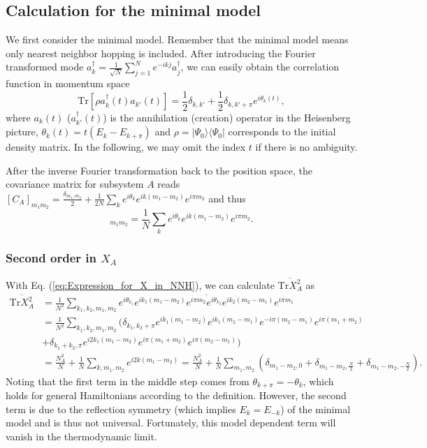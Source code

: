 \documentclass[aps,onecolumn,nofootinbib,superscriptaddress,notitlepage,longbibliography]{revtex4-1}
\def \Tr {\mathrm{Tr}}
\begin{document}
\subsection{Calculation for the minimal model}
We first consider the minimal model. %
Remember that the minimal model means only nearest neighbor hopping
is included. 
 After introducing the Fourier transformed 
 mode $a_{k}^{\dagger}=\frac{1}{\sqrt{N}}\sum_{j=1}^{N}e^{-ikj}a_{j}^{\dagger}$,
we can easily obtain the correlation function in momentum space
\begin{equation}
\Tr[\rho a_{k}^{\dagger}(t)a_{k'}(t)]=\frac{1}{2}\delta_{k,k'}+\frac{1}{2}\delta_{k,k'+\pi}e^{i\theta_{k}(t)},
\end{equation}
where $a_k(t)$ ($a^\dag_{k'}(t)$) is the annihilation (creation) operator in the Heisenberg picture, $\theta_{k}(t)=t(E_{k}-E_{k+\pi})$ and $\rho=|\Psi_0\rangle\langle\Psi_0|$ corresponds
to the initial density matrix. In the following, we may omit %
the
index $t$ if there is no ambiguity.

After the inverse Fourier transformation back to the position space, the covariance
matrix for subsystem $A$ reads  $[C_A]_{m_{1}m_{2}}=\frac{\delta_{m_{1},m_{2}}}{2}+\frac{1}{2N}\sum_{k}e^{i\theta_{k}}e^{ik(m_{1}-m_{2})}e^{i\pi m_{2}}$
and thus
\begin{equation}
[X_A]_{m_{1}m_{2}}=\frac{1}{N}\sum_{k}e^{i\theta_{k}}e^{ik(m_{1}-m_{2})}e^{i\pi m_{2}}.
\label{eq:Expression_for_X_in_NNH}
\end{equation}


\subsubsection{Second order in $X_{A}$}

With Eq. (\ref{eq:Expression_for_X_in_NNH}), we can calculate $\overline{\Tr X_{A}^{2}}$ as
\begin{align*}
\overline{\Tr X_{A}^{2}} & =\frac{1}{N^{2}}\sum_{k_{1},k_{2},m_{1},m_{2}}\overline{e^{i\theta_{k_{1}}}e^{ik_{1}(m_{1}-m_{2})}e^{i\pi m_{2}}e^{i\theta_{k_{2}}}e^{ik_{2}(m_{2}-m_{1})}e^{i\pi m_{1}}}\\
 & =\frac{1}{N^{2}}\sum_{k_{1},k_{2},m_{1},m_{2}}(\delta_{k_{1},k_{2}+\pi}e^{ik_{1}(m_{1}-m_{2})}e^{ik_{1}(m_{2}-m_{1})}e^{-i\pi(m_{2}-m_{1})}e^{i\pi(m_{1}+m_{2})}\\
 & +\delta_{k_{1}+k_{2},\pi}e^{i2k_{1}(m_{1}-m_{2})}e^{i\pi(m_{1}+m_{2})}e^{i\pi(m_{2}-m_{1})})\\
 & =\frac{N_{A}^{2}}{N}+\frac{1}{N}\sum_{k,m_{1},m_{2}}e^{i2k(m_{1}-m_{2})}=\frac{N_{A}^{2}}{N}+\frac{1}{N}\sum_{m_{1},m_{2}}(\delta_{m_{1}-m_{2},0}+\delta_{m_{1}-m_{2},\frac{N}{2}}+\delta_{m_{1}-m_{2},-\frac{N}{2}}).
\end{align*}
Noting that the first term in the middle step comes from $\theta_{k+\pi}=-\theta_{k}$,
which holds for general Hamiltonians according to the definition. However,
the second term is due to the reflection symmetry (which implies $E_k=E_{-k}$) of %
the minimal model and is thus not universal. 
Fortunately, this model dependent term will vanish in the thermodynamic limit.
\end{document}

